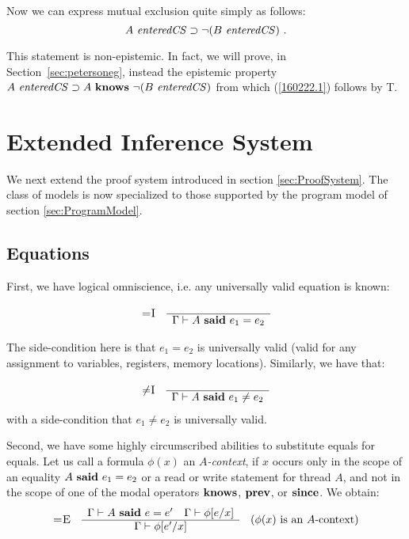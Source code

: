 Now we can express mutual exclusion quite simply as follows:
\begin{equation}
\label{160222.1}
A\ \mathit{enteredCS} \supset \neg(B\ \mathit{enteredCS})\ .
\end{equation}

This statement is non-epistemic. In fact, we will prove, in Section~\ref{sec:petersoneg}, instead the epistemic property
$A\ \EntersCS \Implies A\ \Knows\ \neg(B\ \EntersCS)$ from which (\ref{160222.1}) follows by {\sc T}.
%
\section{Extended Inference System}
%
We next extend the proof system introduced in section \ref{sec:ProofSystem}. The class of models is now specialized to those supported by the program model of section \ref{sec:ProgramModel}. 

\subsection{Equations}
%
 First, we have logical omniscience, i.e. any universally valid equation is known:
 \[
\begin{array}{cc}
\mbox{\sc =I}
&
 \begin{array}{c}
  \\ \hline
  \Gamma\vdash A\ \mathbf{said}\ e_1 = e_2
 \end{array}
 \end{array}
 \]

 The side-condition here is that $e_1 = e_2$ is universally valid (valid for any assignment to variables, registers, memory locations). Similarly, we have that:
 \[
\begin{array}{cc}
\mbox{\sc $\neq$I}
&
 \begin{array}{c}
  \\ \hline
  \Gamma\vdash A\ \mathbf{said}\ e_1 \neq e_2
 \end{array}
 \end{array}
 \]
 with a side-condition that $e_1 \neq e_2$ is universally valid.
 
Second, we have some highly circumscribed abilities to substitute equals for equals. Let us call a formula $\phi(x)$ an \emph{$A$-context}, if $x$ occurs
only in the scope of an equality $A\ \Says\ e_1 = e_2$ or a read or write statement for thread $A$, and not in the scope of one of the modal operators $\mathbf{knows}$, $\mathbf{prev}$, or $\mathbf{since}$. We obtain:
%
\[
\begin{array}{ccc}
\mbox{\sc =E}
&
\begin{array}{c}
\Gamma\vdash A\ \mathbf{said}\ e = e' \hspace*{1em}  \Gamma \vdash \phi[e/x] \\ \hline
\Gamma \vdash \phi[e'/x]
\end{array}
&
(\phi(x)\ \mbox{is an $A$-context})
\end{array}
\]

